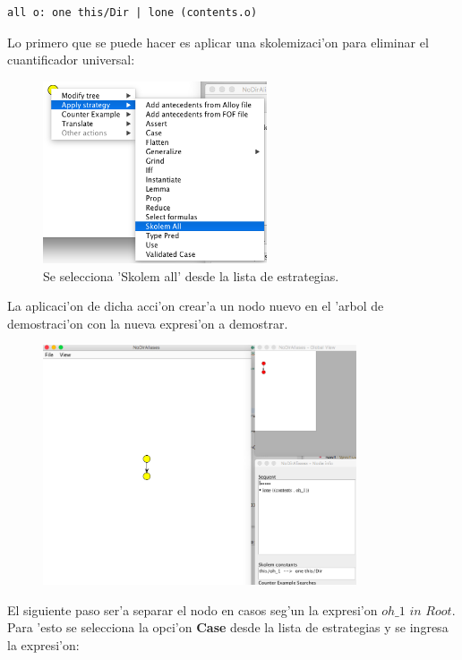 \begin{verbatim}
all o: one this/Dir | lone (contents.o)
\end{verbatim}

Lo primero que se puede hacer es aplicar una skolemizaci'on para eliminar el cuantificador universal:

\begin{figure}[H]
	\includegraphics[width=250px]{img/ejemplo/4.png}
	\centering
	\caption{Se selecciona 'Skolem all' desde la lista de estrategias.}
\end{figure}

La aplicaci'on de dicha acci'on crear'a un nodo nuevo en el 'arbol de demostraci'on con la nueva expresi'on a demostrar.

\begin{figure}[H]
	\includegraphics[width=350px]{img/ejemplo/5.png}
	\centering
	\caption{}
\end{figure}

El siguiente paso ser'a separar el nodo en casos seg'un la expresi'on $oh\_1$ $in$ $Root$. Para 'esto se selecciona la opci'on \textbf{Case} desde la lista de estrategias y se ingresa la expresi'on:

